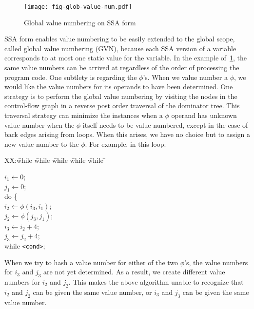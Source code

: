 \begin{figure}[t]
\centering
\texttt{[image: fig-glob-value-num.pdf]}
\caption{Global value numbering on SSA form}
\label{fig:glob-value-num}
\end{figure}

SSA form enables value numbering to be easily extended to the global scope, called global value numbering (GVN), because each SSA version of a variable corresponds to at most one static value for the variable. 
In the example of~\ref{fig:glob-value-num}, the same value numbers can be arrived at regardless of the order of processing the program code. 
One subtlety is regarding the $\phi$'s. 
When we value number a $\phi$, we would like the value numbers for its operands to have been determined. 
One strategy is to perform the global value numbering by visiting the nodes in the control-flow graph in a reverse post order traversal of the dominator tree. 
This traversal strategy can minimize the instances when a $\phi$ operand has unknown value number when the $\phi$ itself needs to be value-numbered, except in the case of back edges arising from loops. 
When this arises, we have no choice but to assign a new value number to the $\phi$. 
For example, in this loop:
\begin{tabbing}
XX:\= while \= while \= while \= while \= while \= \kill

\> \> $i_1 \leftarrow 0$; \\
\> \> $j_1 \leftarrow 0$; \\
\> \> do \{ \\
\> \> \> $i_2 \leftarrow \phi(i_3, i_1)$; \\
\> \> \> $j_2 \leftarrow \phi(j_3, j_1)$; \\
\> \> \> $i_3 \leftarrow i_2 + 4$; \\
\> \> \> $j_3 \leftarrow j_2 + 4$; \\
\> \> while \texttt{<cond>}; \\
\end{tabbing}
When we try to hash a value number for either of the two $\phi$'s, the value numbers for $i_3$ and $j_3$ are not yet determined. 
As a result, we create different value numbers for $i_2$ and $j_2$. 
This makes the above algorithm unable to recognize that $i_2$ and $j_2$ can be given the same value number, or $i_3$ and $j_3$ can be given the same value number.

